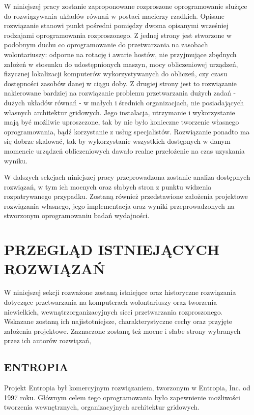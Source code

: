 \documentclass[12pt,a4paper,twoside]{article}
\begin{document}
W niniejszej pracy zostanie zaproponowane rozproszone oprogramowanie służące do rozwiązywania układów równań w postaci macierzy rzadkich. Opisane rozwiązanie stanowi punkt pośredni pomiędzy dwoma opisanymi wcześniej rodzajami oprogramowania rozproszonego. Z jednej strony jest stworzone w podobnym duchu co oprogramowanie do przetwarzania na zasobach wolontariuszy: odporne na rotację i awarie hostów, nie przyjmujące zbędnych założeń w stosunku do udostępnionych maszyn, mocy obliczeniowej urządzeń, fizycznej lokalizacji komputerów wykorzystywanych do obliczeń, czy czasu dostępności zasobów danej w ciągu doby. Z drugiej strony jest to rozwiązanie nakierowane bardziej na rozwiązanie problemu przetwarzania dużych zadań - dużych układów równań - w małych i średnich organizacjach, nie posiadających własnych architektur gridowych. Jego instalacja, utrzymanie i wykorzystanie mają być możliwie uproszczone, tak by nie było konieczne tworzenie własnego oprogramowania, bądź korzystanie z usług specjalistów. Rozwiązanie ponadto ma się dobrze skalować, tak by wykorzystanie wszystkich dostępnych w danym momencie urządzeń obliczeniowych dawało realne przełożenie na czas uzyskania wyniku.

W dalszych sekcjach niniejszej pracy przeprowadzona zostanie analiza dostępnych rozwiązań, w tym ich mocnych oraz słabych stron z punktu widzenia rozpatrywanego przypadku. Zostaną również przedstawione założenia projektowe rozwiązania własnego, jego implementacja oraz wyniki przeprowadzonych na stworzonym oprogramowaniu badań wydajności.


\section{PRZEGLĄD ISTNIEJĄCYCH ROZWIĄZAŃ}

W niniejszej sekcji rozważone zostaną istniejące oraz historyczne rozwiązania dotyczące przetwarzania na komputerach wolontariuszy oraz tworzenia niewielkich, wewnątrzorganizacyjnych sieci przetwarzania rozproszonego. Wskazane zostaną ich najistotniejsze, charakterystyczne cechy oraz przyjęte założenia projektowe. Zaznaczone zostaną też mocne i słabe strony wybranych przez ich autorów rozwiązań,

\subsection{ENTROPIA}

Projekt Entropia \cite{entropia} był komercyjnym rozwiązaniem, tworzonym w Entropia, Inc. od 1997 roku. Głównym celem tego oprogramowania było zapewnienie możliwości tworzenia wewnętrznych, organizacyjnych architektur gridowych. 
\end{document}
